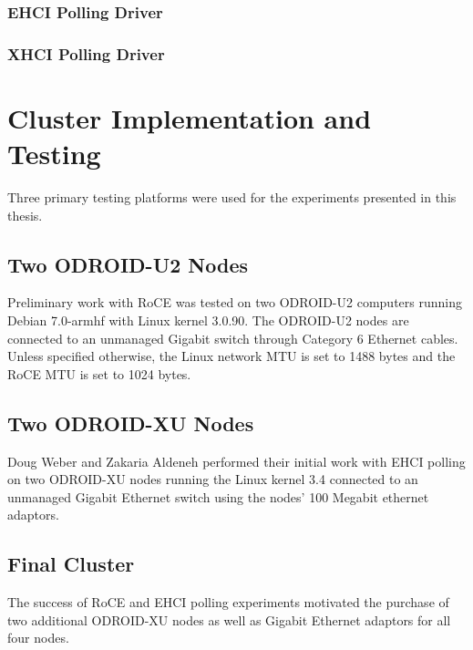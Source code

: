 \documentclass[a4paper]{article}
\begin{document}
\subsubsection{\textbf{EHCI Polling Driver}}


\subsubsection{\textbf{XHCI Polling Driver}}


\newpage
\section{\textbf{Cluster Implementation and Testing}}
\label{cluster}

Three primary testing platforms were used for the experiments presented in this
thesis.

\subsection{\textbf{Two ODROID-U2 Nodes}}

Preliminary work with RoCE was tested on two ODROID-U2 computers running
Debian 7.0-armhf with Linux kernel 3.0.90. The ODROID-U2 nodes are connected to
an unmanaged Gigabit switch through Category 6 Ethernet cables. Unless specified
otherwise, the Linux network MTU is set to 1488 bytes and the RoCE MTU is set to
1024 bytes.

\subsection{\textbf{Two ODROID-XU Nodes}}

Doug Weber and Zakaria Aldeneh performed their initial work with EHCI polling on
two ODROID-XU nodes running the Linux kernel 3.4 connected to an unmanaged
Gigabit Ethernet switch using the nodes' 100 Megabit ethernet adaptors.

\subsection{\textbf{Final Cluster}}

The success of RoCE and EHCI polling experiments motivated the purchase of two
additional ODROID-XU nodes as well as Gigabit Ethernet adaptors for all four
nodes.
\end{document}
